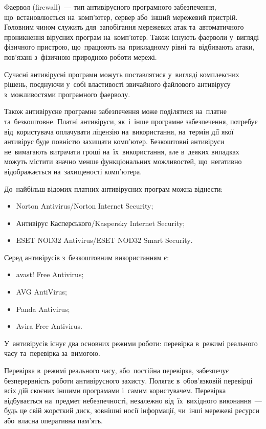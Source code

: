 \documentclass[
	a4paper,
	oneside,
	DIV = 12,
	fontsize = 13pt,
	headings = normal,
]{scrartcl}
\begin{document}
		Фаервол (\textenglish{firewall})~— тип антивірусного програмного забезпечення, що~встановлюється на~комп'ютер, сервер або~інший мережевий пристрій. Головним чином служить для~запобігання мережевих атак та~автоматичного проникнення вірусних програм на~комп’ютер. Також існують фаерволи у~вигляді фізичного пристрою, що~працюють на~прикладному рівні та~відбивають атаки, пов’язані з~фізичною природною роботи мережі.

		Сучасні антивірусні програми можуть поставлятися у~вигляді комплексних рішень, поєднуючи у~собі властивості звичайного файлового антивірусу з~можливостями програмного фаерволу.

		Також антивірусне програмне забезпечення може поділятися на~платне та~безкоштовне. Платні антивіруси, як~і~інше програмне забезпечення, потребує від~користувача оплачувати ліцензію на~використання, на~термін дії якої антивірус буде повністю захищати комп'ютер. Безкоштовні антивіруси не~вимагають витрачати гроші на~їх~використання, але в~деяких випадках можуть містити значно менше функціональних можливостей, що~негативно відображається на~захищеності комп’ютера.

		До~найбільш відомих платних антивірусних програм можна віднести:
		\begin{itemize}[noitemsep]
			\item \textenglish{Norton Antivirus/Norton Internet Security};
			\item Антивірус Касперського/\textenglish{Kaspersky Internet Security};
			\item \textenglish{ESET NOD32 Antivirus/ESET NOD32 Smart Security}.
		\end{itemize}

		Серед антивірусів з~безкоштовним використанням є:
		\begin{itemize}[noitemsep]
			\item \textenglish{avast! Free Antivirus};
			\item \textenglish{AVG AntiVirus};
			\item \textenglish{Panda Antivirus};
			\item \textenglish{Avira Free Antivirus}.
		\end{itemize}

		У~антивірусів існує два основних режими роботи: перевірка в~режимі реального часу та~перевірка за~вимогою.

		Перевірка в~режимі реального часу, або~постійна перевірка, забезпечує безперервність роботи антивірусного захисту. Полягає в~обов'язковій перевірці всіх дій скоєних іншими програмами і~самим користувачем. Перевірка відбувається на~предмет небезпечності, незалежно від~їх~вихідного виконання~— будь це свій жорсткий диск, зовнішні носії інформації, чи~інші мережеві ресурси або~власна оперативна пам'ять.
\end{document}
